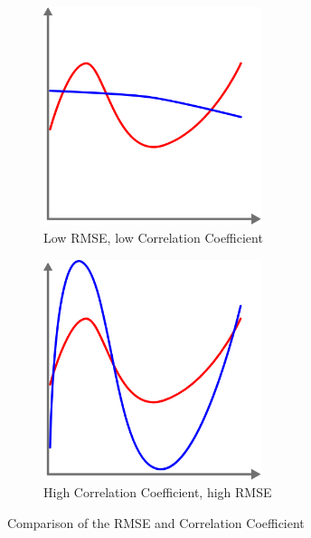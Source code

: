 \begin{figure}
    \centering
    \begin{subfigure}{0.35\textwidth}
        \centering
        \includegraphics[width=0.7\textwidth]{resources/images/low_rmse.png}
        \caption{Low RMSE, low Correlation Coefficient}
        \label{fig:low_rmse}
    \end{subfigure}
    \hspace{0.5cm}
    \begin{subfigure}{0.35\textwidth}
        \centering
        \includegraphics[width=0.7\textwidth]{resources/images/high_corr.png}
        \caption{High Correlation Coefficient, high RMSE}
        \label{fig:high_corr}
    \end{subfigure}
    \caption{Comparison of the RMSE and Correlation Coefficient}
\end{figure}

